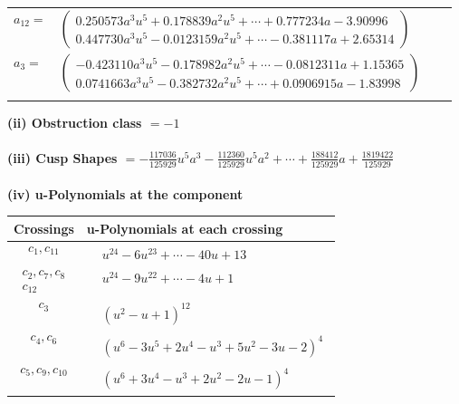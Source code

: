 \documentclass[1p]{elsarticle_modified}
\theoremstyle{definition}
\begin{document}
\begin{tabular}{m{7pt} m{180pt} m{7pt} m{180pt} }
\flushright $a_{12}=$&$\begin{pmatrix}0.250573 a^{3} u^{5}+0.178839 a^{2} u^{5}+\cdots+0.777234 a-3.90996\\0.447730 a^{3} u^{5}-0.0123159 a^{2} u^{5}+\cdots-0.381117 a+2.65314\end{pmatrix}$ \\
\flushright $a_{3}=$&$\begin{pmatrix}-0.423110 a^{3} u^{5}-0.178982 a^{2} u^{5}+\cdots-0.0812311 a+1.15365\\0.0741663 a^{3} u^{5}-0.382732 a^{2} u^{5}+\cdots+0.0906915 a-1.83998\end{pmatrix}$\\&\end{tabular}
\flushleft \textbf{(ii) Obstruction class $= -1$}\\~\\
\flushleft \textbf{(iii) Cusp Shapes $= -\frac{117036}{125929} u^5 a^3-\frac{112360}{125929} u^5 a^2+\cdots+\frac{188412}{125929} a+\frac{1819422}{125929}$}\\~\\
\newpage\renewcommand{\arraystretch}{1}
\flushleft \textbf{(iv) u-Polynomials at the component}\newline \\
\begin{tabular}{m{50pt}|m{274pt}}
Crossings & \hspace{64pt}u-Polynomials at each crossing \\
\hline $$\begin{aligned}c_{1},c_{11}\end{aligned}$$&$\begin{aligned}
&u^{24}-6 u^{23}+\cdots-40 u+13
\end{aligned}$\\
\hline $$\begin{aligned}c_{2},c_{7},c_{8}\\c_{12}\end{aligned}$$&$\begin{aligned}
&u^{24}-9 u^{22}+\cdots-4 u+1
\end{aligned}$\\
\hline $$\begin{aligned}c_{3}\end{aligned}$$&$\begin{aligned}
&(u^2- u+1)^{12}
\end{aligned}$\\
\hline $$\begin{aligned}c_{4},c_{6}\end{aligned}$$&$\begin{aligned}
&(u^6-3 u^5+2 u^4- u^3+5 u^2-3 u-2)^4
\end{aligned}$\\
\hline $$\begin{aligned}c_{5},c_{9},c_{10}\end{aligned}$$&$\begin{aligned}
&(u^6+3 u^4- u^3+2 u^2-2 u-1)^4
\end{aligned}$\\
\hline
\end{tabular}\\~\\
\end{document}
